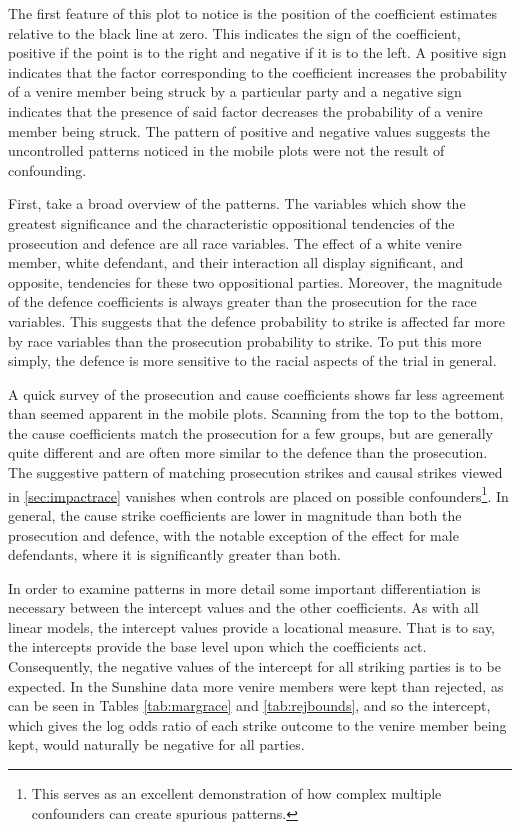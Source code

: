 The first feature of this plot to notice is the position of the coefficient estimates relative to the black line at zero. This
indicates the sign of the coefficient, positive if the point is to the right and negative if it is to the left. A positive sign
indicates that the factor corresponding to the coefficient increases the probability of a venire member being struck by a particular party and a negative sign indicates that the presence of said factor decreases the
probability of a venire member being struck. The pattern of positive and negative values suggests the uncontrolled patterns
noticed in the mobile plots were not the result of confounding.

First, take a broad overview of the patterns. The variables which show the greatest significance and the characteristic
oppositional tendencies of the prosecution and defence are all race variables. The effect of a white venire member, white
defendant, and their interaction all display significant, and opposite, tendencies for these two oppositional parties. Moreover,
the magnitude of the defence coefficients is always greater than the prosecution for the race variables. This suggests that the
defence probability to strike is affected far more by race variables than the prosecution probability to strike. To put this more
simply, the defence is more sensitive to the racial aspects of the trial in general.

A quick survey of the prosecution and cause coefficients shows far less agreement than seemed apparent in the mobile
plots. Scanning from the top to the bottom, the cause coefficients match the prosecution for a few groups, but are generally quite 
different and are often more similar to the defence than the prosecution. The suggestive pattern of matching prosecution strikes
and causal strikes viewed in \ref{sec:impactrace} vanishes when controls are placed on possible confounders\footnote{This serves
  as an excellent demonstration of how complex multiple confounders can create spurious patterns.}. In general, the cause strike
coefficients are lower in magnitude than both the prosecution and defence, with the notable exception of the effect for male
defendants, where it is significantly greater than both.

In order to examine patterns in more detail some important differentiation is necessary between the intercept values and the other
coefficients. As with all linear models, the intercept values provide a locational measure. That is to say, the intercepts provide
the base level upon which the coefficients act. Consequently, the
negative values of the intercept for all striking parties is to
be expected. In the Sunshine data more venire members were kept than rejected, as can be seen in Tables \ref{tab:margrace} and
\ref{tab:rejbounds}, and so the intercept, which gives the log odds ratio of each strike outcome to the venire member being kept,
would naturally be negative for all parties.

